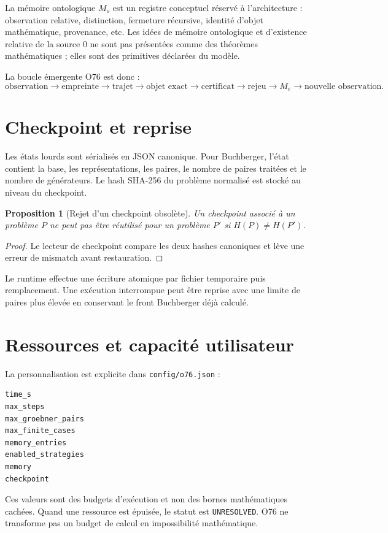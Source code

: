\documentclass[11pt,a4paper]{article}
\newtheorem{proposition}{Proposition}[section]
\newcommand{\Unr}{\texttt{UNRESOLVED}}
\begin{document}
La mémoire ontologique $M_o$ est un registre conceptuel réservé à l'architecture : observation relative, distinction, fermeture récursive, identité d'objet mathématique, provenance, etc. Les idées de mémoire ontologique et d'existence relative de la source 0 ne sont pas présentées comme des théorèmes mathématiques ; elles sont des primitives déclarées du modèle.

La boucle émergente O76 est donc :
\[
\boxed{\text{observation}\to\text{empreinte}\to\text{trajet}\to\text{objet exact}\to\text{certificat}\to\text{rejeu}\to M_e\to\text{nouvelle observation}.}
\]

\section{Checkpoint et reprise}
Les états lourds sont sérialisés en JSON canonique. Pour Buchberger, l'état contient la base, les représentations, les paires, le nombre de paires traitées et le nombre de générateurs. Le hash SHA-256 du problème normalisé est stocké au niveau du checkpoint.

\begin{proposition}[Rejet d'un checkpoint obsolète]
Un checkpoint associé à un problème $P$ ne peut pas être réutilisé pour un problème $P'$ si $H(P)\neq H(P')$.
\end{proposition}
\begin{proof}
Le lecteur de checkpoint compare les deux hashes canoniques et lève une erreur de mismatch avant restauration.
\end{proof}

Le runtime effectue une écriture atomique par fichier temporaire puis remplacement. Une exécution interrompue peut être reprise avec une limite de paires plus élevée en conservant le front Buchberger déjà calculé.

\section{Ressources et capacité utilisateur}
La personnalisation est explicite dans \texttt{config/o76.json} :
\begin{verbatim}
time_s
max_steps
max_groebner_pairs
max_finite_cases
memory_entries
enabled_strategies
memory
checkpoint
\end{verbatim}
Ces valeurs sont des budgets d'exécution et non des bornes mathématiques cachées. Quand une ressource est épuisée, le statut est \Unr. O76 ne transforme pas un budget de calcul en impossibilité mathématique.
\end{document}

